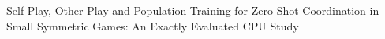 Self-Play, Other-Play and Population Training for Zero-Shot Coordination in Small Symmetric Games: An Exactly Evaluated CPU Study
